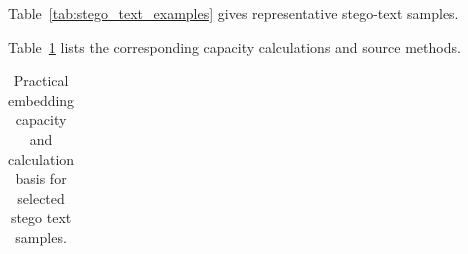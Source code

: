 Table~\ref{tab:stego_text_examples} gives representative stego-text samples.

Table~\ref{tab:stego_examples} lists the corresponding capacity calculations and source methods.

\onecolumn
\begingroup\footnotesize
\begin{longtable}{|>{\raggedright\arraybackslash}p{10cm}|>{\raggedright\arraybackslash}p{1.2cm}|>{\raggedright\arraybackslash}p{1cm}|>{\raggedright\arraybackslash}p{2cm}|}
  \caption{Practical embedding capacity and calculation basis for selected stego text samples.}
  \label{tab:stego_examples}                                                                                                                                                                                                                                                                                                                                                                                                                                                                                                                                                                                                                                                                                                                                                                                                                                                                                                                                                                                                                                                                                                                                                                                                                                                                                                                                                                                                                                                                                                                                                                                                                                                                                                                                                                                                                                                                                                                                                                                                                                                                                                                                                                                                                                                                                                                                        \\

\end{longtable}
